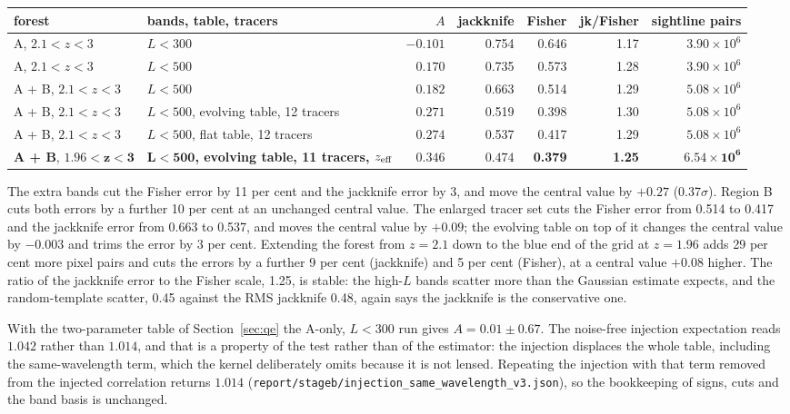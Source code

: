 \documentclass[11pt,a4paper]{article}
\begin{document}
\begin{center}\small
\begin{tabular}{llrrrrr}
\toprule
forest & bands, table, tracers & $A$ & jackknife & Fisher & jk/Fisher & sightline pairs\\
\midrule
A, $2.1<z<3$ & $L<300$ & $-0.101$ & 0.754 & 0.646 & 1.17 & $3.90\times10^6$\\
A, $2.1<z<3$ & $L<500$ & $0.170$ & 0.735 & 0.573 & 1.28 & $3.90\times10^6$\\
A + B, $2.1<z<3$ & $L<500$ & $0.182$ & 0.663 & 0.514 & 1.29 & $5.08\times10^6$\\
A + B, $2.1<z<3$ & $L<500$, evolving table, 12 tracers & $0.271$ & 0.519 & 0.398 & 1.30 & $5.08\times10^6$\\
A + B, $2.1<z<3$ & $L<500$, flat table, 12 tracers & $0.274$ & 0.537 & 0.417 & 1.29 & $5.08\times10^6$\\
\textbf{A + B}, $\bm{1.96<z<3}$ & $\bm{L<500}$\textbf{, evolving table, 11 tracers, $z_{\rm eff}$} & $\mathbf{0.346}$ & $\mathbf{0.474}$ & \textbf{0.379} & \textbf{1.25} & $\bm{6.54\times10^6}$\\
\bottomrule
\end{tabular}
\end{center}

\noindent The extra bands cut the Fisher error by 11 per cent and the jackknife error by 3, and move the central value by $+0.27$ (0.37$\sigma$). Region B cuts both errors by a further 10 per cent at an unchanged central value. The enlarged tracer set cuts the Fisher error from 0.514 to 0.417 and the jackknife error from 0.663 to 0.537, and moves the central value by $+0.09$; the evolving table on top of it changes the central value by $-0.003$ and trims the error by 3 per cent. Extending the forest from $z=2.1$ down to the blue end of the grid at $z=1.96$ adds 29 per cent more pixel pairs and cuts the errors by a further 9 per cent (jackknife) and 5 per cent (Fisher), at a central value $+0.08$ higher. The ratio of the jackknife error to the Fisher scale, 1.25, is stable: the high-$L$ bands scatter more than the Gaussian estimate expects, and the random-template scatter, 0.45 against the RMS jackknife 0.48, again says the jackknife is the conservative one.

With the two-parameter table of Section~\ref{sec:qe} the A-only, $L<300$ run gives $A=0.01\pm0.67$. The noise-free injection expectation reads $1.042$ rather than $1.014$, and that is a property of the test rather than of the estimator: the injection displaces the whole table, including the same-wavelength term, which the kernel deliberately omits because it is not lensed. Repeating the injection with that term removed from the injected correlation returns $1.014$ (\texttt{report/stageb/injection\_same\_wavelength\_v3.json}), so the bookkeeping of signs, cuts and the band basis is unchanged.
\end{document}
